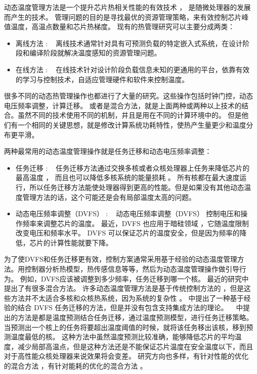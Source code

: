 动态温度管理方法是一个提升芯片热相关性能的有效技术 \cite{Donald:ISCA'06}， 是随微处理器的发展而产生的技术。
管理问题的目的是寻找最优的资源管理策略，来有效控制芯片峰值温度，高温点数量和芯片热梯度。
现有的热管理研究可以主要分成两类：
\begin{itemize}
\item 离线方法 : ~ 离线技术通常针对具有可预测负载的特定嵌入式系统，在设计阶段和编译阶段就解决温度感知的资源管理问题。
\item 在线方法 : ~ 在线技术针对设计阶段负载信息未知的更通用的平台，依靠有效的学习与控制技术，自适应管理硬件和软件来控制温度。
\end{itemize}

很多不同的动态热管理操作也都进行了大量的研究。这些操作包括时钟门控，动态电压频率调整，计算迁移。
或者是混合方法，就是上面两种或两种以上技术的结合。虽然不同的技术使用不同的机制，并且是用在不同的计算环境中的。
但是他们有一个相同的关键思想，就是修改计算系统功耗特性，使热产生量更少和温度分布更平滑。

两种最常用的动态温度管理操作就是任务迁移和动态电压频率调整：
\begin{itemize}
\item 任务迁移 :  ~ 任务迁移方法通过交换多核或者众核处理器上任务来降低芯片的最高温度 \cite{Powell:ASPLOS'04,Ge:DAC'10,Chantem:TVLSI'11,Liu:DATE'12,Ayoub:ISLPED'09,Ebi:ICCAD'09} ，
而且也可以降低多核系统的能量损耗 \cite{Cong:ISLPED'12}。
所有核都在最大速度运行，所以任务迁移方法能使处理器得到更高的性能。但是如果没有其他动态温度管理方法的话，这个可能还是会有局部温度太高的问题。
\item 动态电压频率调整（DVFS） :  ~ 动态电压频率调整（DVFS）\cite{Skadron:ISCA'03,Jayaseelan:ICCAD'09,Mutapcic:TCASI'09} 控制电压和操作频率来调整芯片的温度。
 最近，DVFS 也应用于暗硅领域 \cite{Khdr:dac'15,Muthukaruppan:dac'13}，它随温度限制改变电压和频率水平。
 DVFS 可以保证芯片的温度安全，但是因为频率的降低，芯片的计算性能就要下降。
\end{itemize}


 
 
 为了使DVFS和任务迁移更有效，控制方案通常采用基于经验的动态温度管理方法。用控制器分析热模型，热传感信息等等，然后为动态温度管理操作做引导行为。
 例如，DVFS应该被调整到多少频率，任务迁移到哪一个核。
 最近的研究中提出了有很多混合方法。
 许多动态温度管理方法是基于传统控制方法的 \cite{Kadin:GLSVLSI'09}，但是这些方法并不太适合多核和众核热系统，因为系统的复杂性 \cite{Bartolini:TPDS'13}。 
 \cite{Brooks:HPCA'04}中提出了一种基于经验的结合 DVFS 任务迁移的方法，但是并没有包含支持集成方法的理论。
 ~\cite{yeo2008predictive,coskun2008proactive} 中提出的方法是都是温度预测结合任务迁移，通过温度预测模型，进行任务迁移策略。
 当预测出一个核上的任务将要超出温度阈值的时候，就将该任务移出该核，移到预测温度最低的核。
 这种方法中虽然温度预测比较准确，能够降低芯片的平均温度，减少局部高温点，但是这种方法还是不能保证芯片温度在安全温度以下，而且对于高性能众核处理器来说效果将会变差。
 研究方向也多样，有针对性能的优化的混合方法 \cite{Hanumaiah:TCAD'11}，有针对能耗的优化的混合方法 \cite{Hanumaiah:TCOMP'14,Tan:ASPDAC'15}。
 
